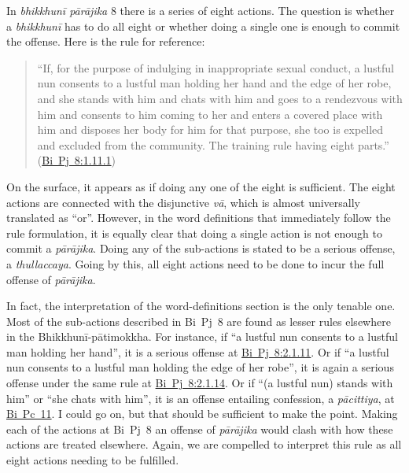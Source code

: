 \documentclass[12pt,openany]{book}%
\begin{document}
In \textit{\textsanskrit{bhikkhunī} \textsanskrit{pārājika}} 8 there is a series of eight actions. The question is whether a \textit{\textsanskrit{bhikkhunī}} has to do all eight or whether doing a single one is enough to commit the offense. Here is the rule for reference:

\begin{quotation}%
“If, for the purpose of indulging in inappropriate sexual conduct, a lustful nun consents to a lustful man holding her hand and the edge of her robe, and she stands with him and chats with him and goes to a rendezvous with him and consents to him coming to her and enters a covered place with him and disposes her body for him for that purpose, she too is expelled and excluded from the community. The training rule having eight parts.” (\href{https://suttacentral.net/pli-tv-bi-vb-pj8/en/brahmali\#1.11.1}{Bi~Pj~8:1.11.1})

%
\end{quotation}

On the surface, it appears as if doing any one of the eight is sufficient. The eight actions are connected with the disjunctive \textit{\textsanskrit{vā}}, which is almost universally translated as “or”. However, in the word definitions that immediately follow the rule formulation, it is equally clear that doing a single action is not enough to commit a \textit{\textsanskrit{pārājika}}. Doing any of the sub-actions is stated to be a serious offense, a \textit{thullaccaya}. Going by this, all eight actions need to be done to incur the full offense of \textit{\textsanskrit{pārājika}}.

In fact, the interpretation of the word-definitions section is the only tenable one. Most of the sub-actions described in Bi Pj 8 are found as lesser rules elsewhere in the \textsanskrit{Bhikkhunī}-\textsanskrit{pātimokkha}. For instance, if “a lustful nun consents to a lustful man holding her hand”, it is a serious offense at \href{https://suttacentral.net/pli-tv-bi-vb-pj8/en/brahmali\#2.1.11}{Bi~Pj~8:2.1.11}. Or if “a lustful nun consents to a lustful man holding the edge of her robe”, it is again a serious offense under the same rule at \href{https://suttacentral.net/pli-tv-bi-vb-pj8/en/brahmali\#2.1.14}{Bi~Pj~8:2.1.14}. Or if “(a lustful nun) stands with him” or “she chats with him”, it is an offense entailing confession, a \textit{\textsanskrit{pācittiya}}, at \href{https://suttacentral.net/pli-tv-bi-vb-pc11/en/brahmali\#1.12.1}{Bi~Pc~11}. I could go on, but that should be sufficient to make the point. Making each of the actions at Bi Pj 8 an offense of \textit{\textsanskrit{pārājika}} would clash with how these actions are treated elsewhere. Again, we are compelled to interpret this rule as all eight actions needing to be fulfilled.
\end{document}

